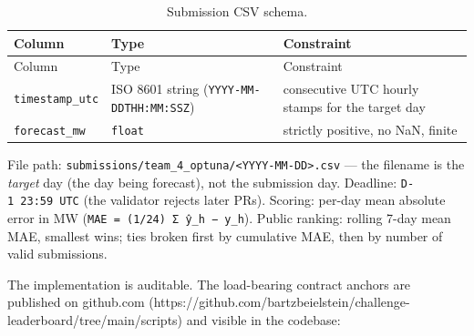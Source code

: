 \documentclass[
  english,
  letterpaper,
]{scrbook}
\begin{document}
\begin{longtable}[]{@{}
  >{\raggedright\arraybackslash}p{}
  >{\raggedright\arraybackslash}p{}
  >{\raggedright\arraybackslash}p{}@{}}
\caption{Submission CSV schema.}\label{tbl-live-schema}\tabularnewline
\toprule\noalign{}
\begin{minipage}[b]{\linewidth}\raggedright
Column
\end{minipage} & \begin{minipage}[b]{\linewidth}\raggedright
Type
\end{minipage} & \begin{minipage}[b]{\linewidth}\raggedright
Constraint
\end{minipage} \\
\midrule\noalign{}
\endfirsthead
\toprule\noalign{}
\begin{minipage}[b]{\linewidth}\raggedright
Column
\end{minipage} & \begin{minipage}[b]{\linewidth}\raggedright
Type
\end{minipage} & \begin{minipage}[b]{\linewidth}\raggedright
Constraint
\end{minipage} \\
\midrule\noalign{}
\endhead
\bottomrule\noalign{}
\endlastfoot
\texttt{timestamp\_utc} & ISO 8601 string
(\texttt{YYYY-MM-DDTHH:MM:SSZ}) & 24 consecutive UTC hourly stamps for
the target day \\
\texttt{forecast\_mw} & \texttt{float} & strictly positive, no NaN,
finite \\
\end{longtable}

File path:
\texttt{submissions/team\_4\_optuna/\textless{}YYYY-MM-DD\textgreater{}.csv}
--- the filename is the \emph{target} day (the day being forecast), not
the submission day. Deadline: \texttt{D-1\ 23:59\ UTC} (the validator
rejects later PRs). Scoring: per-day mean absolute error in MW
(\texttt{MAE\ =\ (1/24)\ Σ\ \textbar{}ŷ\_h\ −\ y\_h\textbar{}}). Public
ranking: rolling 7-day mean MAE, smallest wins; ties broken first by
cumulative MAE, then by number of valid submissions.

The implementation is auditable. The load-bearing contract anchors are
published on github.com
(https://github.com/bartzbeielstein/challenge-leaderboard/tree/main/scripts)
and visible in the codebase:
\end{document}
